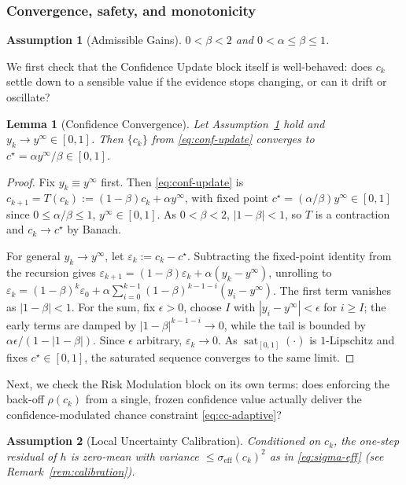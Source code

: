 \documentclass[letterpaper, 10 pt, conference]{ieeeconf}
\newtheorem{assumption}{Assumption}
\newtheorem{lemma}{Lemma}
\begin{document}
\subsubsection{Convergence, safety, and monotonicity}
\label{sec:theory-convergence}

\begin{assumption}[Admissible Gains]
\label{ass:gains}
$0<\beta<2$ and $0<\alpha\le\beta\le1$.
\end{assumption}

We first check that the Confidence Update block itself is well-behaved: does $c_k$ settle down to a sensible value if the evidence stops changing, or can it drift or oscillate?

\begin{lemma}[Confidence Convergence]
\label{lem:convergence}
Let Assumption~\ref{ass:gains} hold and $y_k \to y^\infty\in [0,1]$. Then $\{c_k\}$ from \eqref{eq:conf-update} converges to $c^\star = \alpha y^\infty/\beta \in[0,1]$.
\end{lemma}
\begin{proof}
Fix $y_k\equiv y^\infty$ first. Then \eqref{eq:conf-update} is $c_{k+1}=T(c_k):=(1-\beta)c_k+\alpha y^\infty$, with fixed point $c^\star=(\alpha/\beta)y^\infty\in[0,1]$ since $0\le\alpha/\beta\le1$, $y^\infty\in[0,1]$. As $0<\beta<2$, $|1-\beta|<1$, so $T$ is a contraction and $c_k\to c^\star$ by Banach.

For general $y_k\to y^\infty$, let $\varepsilon_k:=c_k-c^\star$. Subtracting the fixed-point identity from the recursion gives $\varepsilon_{k+1}=(1-\beta)\varepsilon_k+\alpha(y_k-y^\infty)$, unrolling to $\varepsilon_k=(1-\beta)^k\varepsilon_0+\alpha\sum_{i=0}^{k-1}(1-\beta)^{k-1-i}(y_i-y^\infty)$. The first term vanishes as $|1-\beta|<1$. For the sum, fix $\epsilon>0$, choose $I$ with $|y_i-y^\infty|<\epsilon$ for $i\ge I$; the early terms are damped by $|1-\beta|^{k-1-i}\to0$, while the tail is bounded by $\alpha\epsilon/(1-|1-\beta|)$. Since $\epsilon$ arbitrary, $\varepsilon_k\to0$. As $\operatorname{sat}_{[0,1]}(\cdot)$ is $1$-Lipschitz and fixes $c^\star\in[0,1]$, the saturated sequence converges to the same limit.
\end{proof}

Next, we check the Risk Modulation block on its own terms: does enforcing the back-off $\rho(c_k)$ from a single, frozen confidence value actually deliver the confidence-modulated chance constraint \eqref{eq:cc-adaptive}?

\begin{assumption}[Local Uncertainty Calibration]
\label{ass:calibration}
Conditioned on $c_k$, the one-step residual of $h$ is zero-mean with variance $\le\sigma_{\mathrm{eff}}(c_k)^2$ as in \eqref{eq:sigma-eff} (see Remark~\ref{rem:calibration}).
\end{assumption}
\end{document}
